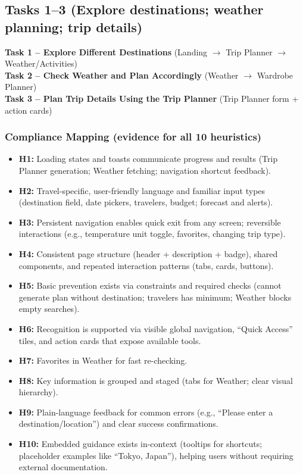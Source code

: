 \documentclass[11pt,a4paper]{article}
\begin{document}
\subsection{Tasks 1--3 (Explore destinations; weather planning; trip details)}
\textbf{Task 1 – Explore Different Destinations} (Landing $\rightarrow$ Trip Planner $\rightarrow$ Weather/Activities)\\
\textbf{Task 2 – Check Weather and Plan Accordingly} (Weather $\rightarrow$ Wardrobe Planner)\\
\textbf{Task 3 – Plan Trip Details Using the Trip Planner} (Trip Planner form + action cards)

\subsubsection{Compliance Mapping (evidence for all 10 heuristics)}
\begin{itemize}
    \item \textbf{H1:} Loading states and toasts communicate progress and results (Trip Planner generation; Weather fetching; navigation shortcut feedback).
    \item \textbf{H2:} Travel-specific, user-friendly language and familiar input types (destination field, date pickers, travelers, budget; forecast and alerts).
    \item \textbf{H3:} Persistent navigation enables quick exit from any screen; reversible interactions (e.g., temperature unit toggle, favorites, changing trip type).
    \item \textbf{H4:} Consistent page structure (header + description + badge), shared components, and repeated interaction patterns (tabs, cards, buttons).
    \item \textbf{H5:} Basic prevention exists via constraints and required checks (cannot generate plan without destination; travelers has minimum; Weather blocks empty searches).
    \item \textbf{H6:} Recognition is supported via visible global navigation, ``Quick Access'' tiles, and action cards that expose available tools.
    \item \textbf{H7:}  Favorites in Weather for fast re-checking.
    \item \textbf{H8:} Key information is grouped and staged (tabs for Weather; clear visual hierarchy).
    \item \textbf{H9:} Plain-language feedback for common errors (e.g., ``Please enter a destination/location'') and clear success confirmations.
    \item \textbf{H10:} Embedded guidance exists in-context (tooltips for shortcuts; placeholder examples like ``Tokyo, Japan''), helping users without requiring external documentation.
\end{itemize}
\end{document}

